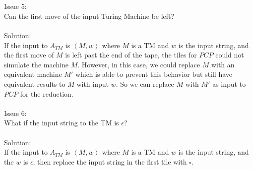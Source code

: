 \documentclass[letterpaper,notitlepage,twoside]{article}
\begin{document}
\\\\
Issue 5:\\
Can the first move of the input Turing Machine be left?\\\\
Solution:\\
If the input to $A_{TM}$ is $\left<M,w\right>$ where $M$ is a TM and $w$ is the input string, and the first move of $M$ is left past the end of the tape, the tiles for $PCP$ could not simulate the machine $M$. However, in this case, we could replace $M$ with an equivalent machine $M'$ which is able to prevent this behavior but still have equivalent results to $M$ with input $w$. So we can replace $M$ with $M'$ as input to $PCP$ for the reduction.
\\\\
Issue 6:\\
What if the input string to the TM is $\epsilon$?\\\\
Solution:\\
If the input to $A_{TM}$ is $\left<M,w\right>$ where $M$ is a TM and $w$ is the input string, and the $w$ is $\epsilon$, then replace the input string in the first tile with $\square$.
\end{document}
